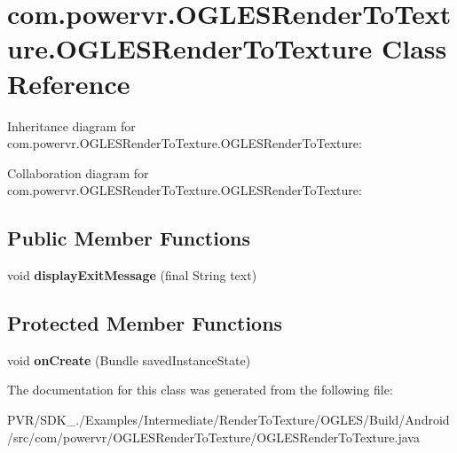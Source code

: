 \hypertarget{classcom_1_1powervr_1_1_o_g_l_e_s_render_to_texture_1_1_o_g_l_e_s_render_to_texture}{\section{com.\+powervr.\+O\+G\+L\+E\+S\+Render\+To\+Texture.\+O\+G\+L\+E\+S\+Render\+To\+Texture Class Reference}
\label{classcom_1_1powervr_1_1_o_g_l_e_s_render_to_texture_1_1_o_g_l_e_s_render_to_texture}
}


Inheritance diagram for com.\+powervr.\+O\+G\+L\+E\+S\+Render\+To\+Texture.\+O\+G\+L\+E\+S\+Render\+To\+Texture\+:


Collaboration diagram for com.\+powervr.\+O\+G\+L\+E\+S\+Render\+To\+Texture.\+O\+G\+L\+E\+S\+Render\+To\+Texture\+:
\subsection*{Public Member Functions}
\begin{DoxyCompactItemize}
\item 
\hypertarget{classcom_1_1powervr_1_1_o_g_l_e_s_render_to_texture_1_1_o_g_l_e_s_render_to_texture_aeffb7eb53314b880252caf15e98328e5}{void {\bfseries display\+Exit\+Message} (final String text)}\label{classcom_1_1powervr_1_1_o_g_l_e_s_render_to_texture_1_1_o_g_l_e_s_render_to_texture_aeffb7eb53314b880252caf15e98328e5}

\end{DoxyCompactItemize}
\subsection*{Protected Member Functions}
\begin{DoxyCompactItemize}
\item 
\hypertarget{classcom_1_1powervr_1_1_o_g_l_e_s_render_to_texture_1_1_o_g_l_e_s_render_to_texture_a31331c717a9c6619e1c46292f9643983}{void {\bfseries on\+Create} (Bundle saved\+Instance\+State)}\label{classcom_1_1powervr_1_1_o_g_l_e_s_render_to_texture_1_1_o_g_l_e_s_render_to_texture_a31331c717a9c6619e1c46292f9643983}

\end{DoxyCompactItemize}


The documentation for this class was generated from the following file\+:\begin{DoxyCompactItemize}
\item 
P\+V\+R/\+S\+D\+K\+\_./\+Examples/\+Intermediate/\+Render\+To\+Texture/\+O\+G\+L\+E\+S/\+Build/\+Android/src/com/powervr/\+O\+G\+L\+E\+S\+Render\+To\+Texture/O\+G\+L\+E\+S\+Render\+To\+Texture.\+java\end{DoxyCompactItemize}
